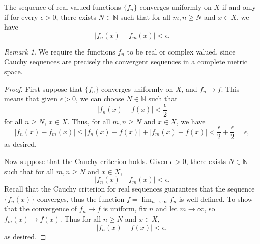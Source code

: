 \documentclass[11pt]{article}
\def\N{\mathbb{N}}
\theoremstyle{definition}
\theoremstyle{remark}
\newtheorem*{remark}{Remark}
\numberwithin{equation}{module}
\begin{document}
    \begin{theorem} \label{th:cauchy}
        The sequence of real-valued functions $\{f_n\}$ converges uniformly on $X$
        if and only if for every $\epsilon > 0$, there exists $N \in \N$ such that
        for all $m, n \geq N$ and $x \in X$, we have \[
            |f_n(x) - f_m(x)| < \epsilon.
        \] 
        \begin{remark}
            We require the functions $f_n$ to be real or complex valued, since
            Cauchy sequences are precisely the convergent sequences in a complete
            metric space.
        \end{remark}
    \end{theorem}
    \begin{proof}
        First suppose that $\{f_n\}$ converges uniformly on $X$, and $f_n \to f$.
        This means that given $\epsilon > 0$, we can choose $N \in \N$ such that \[
            |f_n(x) - f(x)| < \frac{\epsilon}{2}
        \] for all $n \geq N$, $x \in X$.
        Thus, for all $m, n \geq N$ and $x \in X$, we have \[
            |f_n(x) - f_m(x)| \leq |f_n(x) - f(x)| + |f_m(x) - f(x)| <
            \frac{\epsilon}{2} + \frac{\epsilon}{2} = \epsilon,
        \] as desired.

        Now suppose that the Cauchy criterion holds. Given $\epsilon > 0$,
        there exists $N \in \N$ such that for all $m, n \geq N$ and $x \in X$, \[
            |f_n(x) - f_m(x)| < \epsilon.
        \]
        Recall that the Cauchy criterion for real sequences guarantees that the
        sequence $\{f_n(x)\}$ converges, thus the function
        $f = \lim_{n \to \infty} f_n$ is well defined.
        To show that the convergence of $f_n \to f$ is uniform, fix $n$ and let $m
        \to \infty$, so $f_m(x) \to f(x)$. Thus for all $n \geq N$ and $x \in X$, \[
            |f_n(x) - f(x)| < \epsilon,
        \] as desired.
    \end{proof}
\end{document}
